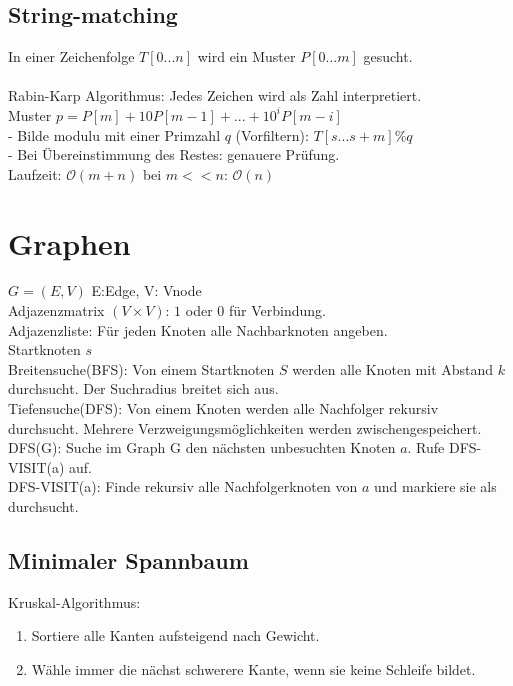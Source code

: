 \documentclass[10pt,a4paper]{scrartcl}
\begin{document}
	\subsection{String-matching}
	In einer Zeichenfolge $T[0 ... n]$ wird ein Muster $P[0...m]$ gesucht.\\ 
	\\
	Rabin-Karp Algorithmus: Jedes Zeichen wird als Zahl interpretiert.\\
	Muster $p = P[m] + 10 P[m-1] + ... + 10^i P[m-i]$\\
	- Bilde modulu mit einer Primzahl $q$ (Vorfiltern): $T[s ... s+m] \% q$\\
	- Bei Übereinstimmung des Restes: genauere Prüfung.\\
	Laufzeit: $\mathcal O(m+n)$ bei $m<<n$: $\mathcal O(n)$\\





\section{Graphen}
$G = (E, V)$ \quad E:Edge, V: Vnode\\
Adjazenzmatrix $(V \times V)$: $1$ oder $0$ für Verbindung.\\
Adjazenzliste: Für jeden Knoten alle Nachbarknoten angeben.\\
Startknoten $s$\\

Breitensuche(BFS): Von einem Startknoten $S$ werden alle Knoten mit Abstand $k$ durchsucht. Der Suchradius breitet sich aus.\\
Tiefensuche(DFS): Von einem Knoten werden alle Nachfolger rekursiv durchsucht. Mehrere Verzweigungsmöglichkeiten werden zwischengespeichert.\\
DFS(G): Suche im Graph G den nächsten unbesuchten Knoten $a$. Rufe DFS-VISIT(a) auf.\\
DFS-VISIT(a): Finde rekursiv alle Nachfolgerknoten von $a$ und markiere sie als durchsucht.\\

	\subsection{Minimaler Spannbaum}
	Kruskal-Algorithmus:
	\begin{enumerate}\itemsep-2pt
		\item Sortiere alle Kanten aufsteigend nach Gewicht.
		\item Wähle immer die nächst schwerere Kante, wenn sie keine Schleife bildet.
	\end{enumerate}
\end{document}
